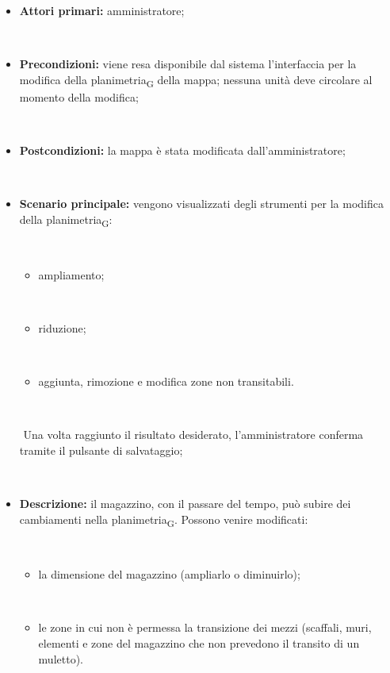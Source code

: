 \begin{itemize}

​    \item   \textbf{Attori primari:} amministratore;

​    \item   \textbf{Precondizioni:} viene resa disponibile dal sistema l'interfaccia per la modifica della planimetria\textsubscript{G} della mappa; nessuna unità deve circolare al momento della modifica;

​    \item   \textbf{Postcondizioni:} la mappa è stata modificata dall'amministratore;

​    \item   \textbf{Scenario principale:} vengono visualizzati degli strumenti per la modifica della planimetria\textsubscript{G}:

​    \begin{itemize}

​        \item ampliamento;

​        \item riduzione;

​        \item aggiunta, rimozione e modifica zone non transitabili.

​    \end{itemize}

​    Una volta raggiunto il risultato desiderato, l'amministratore conferma tramite il pulsante di salvataggio;

​    \item   \textbf{Descrizione:} il magazzino, con il passare del tempo, può subire dei cambiamenti nella planimetria\textsubscript{G}. Possono venire modificati:

​    \begin{itemize}

​        \item la dimensione del magazzino (ampliarlo o diminuirlo);

​        \item le zone in cui non è permessa la transizione dei mezzi (scaffali, muri, elementi e zone del magazzino che non prevedono il transito di un muletto).

​    \end{itemize}

\end{itemize}




